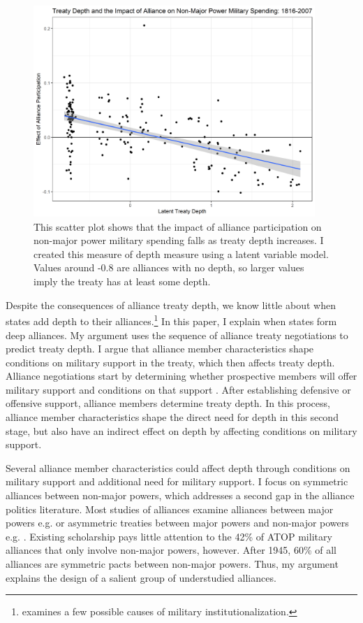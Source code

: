 \documentclass[12pt]{article}
\begin{document}
\begin{figure}[hbtp]
\centering
\includegraphics[width=0.95\textwidth]{../figures/depth-motive.png}
\caption{This scatter plot shows that the impact of alliance participation on non-major power military spending falls as treaty depth increases. I created this measure of depth measure using a latent variable model. Values around -0.8 are alliances with no depth, so larger values imply the treaty has at least some depth.}
\label{fig:depth-motive}
\end{figure}


Despite the consequences of alliance treaty depth, we know little about when states add depth to their alliances.\footnote{\citet{Mattes2012} examines a few possible causes of military institutionalization.}
In this paper, I explain when states form deep alliances.
My argument uses the sequence of alliance treaty negotiations to predict treaty depth. 
I argue that alliance member characteristics shape conditions on military support in the treaty, which then affects treaty depth. 
Alliance negotiations start by determining whether prospective members will offer military support and conditions on that support \citep{Poast2019a}. 
After establishing defensive or offensive support, alliance members determine treaty depth. 
In this process, alliance member characteristics shape the direct need for depth in this second stage, but also have an indirect effect on depth by affecting conditions on military support. 


Several alliance member characteristics could affect depth through conditions on military support and additional need for military support. 
I focus on symmetric alliances between non-major powers, which addresses a second gap in the alliance politics literature.  
Most studies of alliances examine alliances between major powers e.g. \citep{Snyder1997} or asymmetric treaties between major powers and non-major powers e.g. \citep{Morrow1991, Yarhi-Miloetal2016}. 
Existing scholarship pays little attention to the 42\% of ATOP military alliances that only involve non-major powers, however. %
After 1945, 60\% of all alliances are symmetric pacts between non-major powers. %
Thus, my argument explains the design of a salient group of understudied alliances. 
\end{document}

